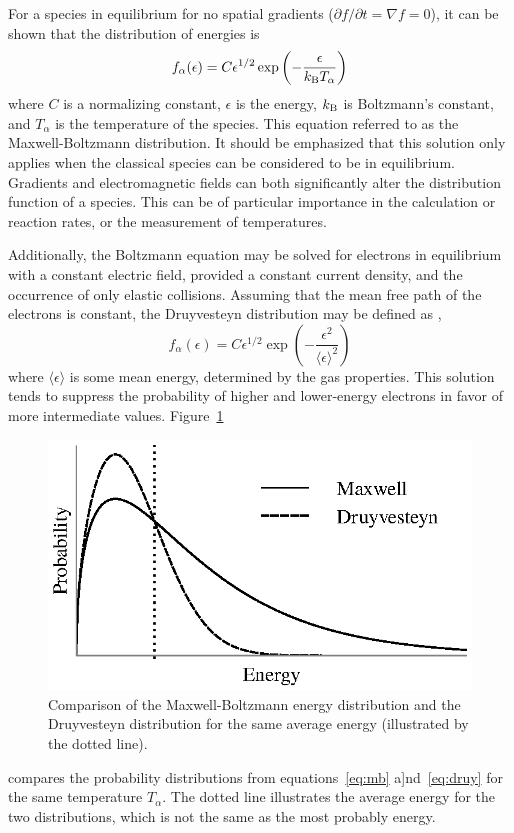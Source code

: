 For a species in equilibrium for no spatial gradients ($\partial f/\partial t =
\nabla f = 0$), it can be shown \cite{Druyvesteyn1940} that the distribution of
energies is
\begin{equation}\label{eq:mb}
  f_\alpha(\epsilon) = C \epsilon^{1/2}
          \exp\left( -\frac{\epsilon}{k_\mathrm{B} T_\alpha}\right)
\end{equation}
where $C$ is a normalizing constant, $\epsilon$ is the energy, $k_\mathrm{B}$ is
Boltzmann's constant, and $T_\alpha$ is the temperature of the species. This
equation referred to as the Maxwell-Boltzmann distribution. It should be
emphasized that this solution only applies when the classical species can be
considered to be in equilibrium. Gradients and electromagnetic fields can both
significantly alter the distribution function of a species. This can be of
particular importance in the calculation or reaction rates, or the measurement
of temperatures.

Additionally, the Boltzmann equation may be solved for electrons in equilibrium
with a constant electric field, provided a constant current density, and the
occurrence of only elastic collisions. Assuming that the mean free path of the
electrons is constant, the Druyvesteyn distribution may be defined as
\cite{Druyvesteyn1940},
\begin{equation}
  f_\alpha(\epsilon) = C \epsilon^{1/2}
           \exp\left(-\frac{\epsilon^2}{\langle \epsilon \rangle^2} \right)
  \label{eq:druy}
\end{equation}
where $\langle\epsilon\rangle$ is some mean energy, determined by the gas
properties. This solution tends to suppress the probability of higher and
lower-energy electrons in favor of more intermediate values.
Figure~\ref{fig:simpledists}
\begin{figure}
  \centering
  \includegraphics{./chapters/theory/figures/simpledists.eps}
  \caption{Comparison of the Maxwell-Boltzmann energy distribution and the
    Druyvesteyn distribution for the same average energy (illustrated by the
  dotted line).}
  \label{fig:simpledists}
\end{figure}
compares the probability distributions from equations~\ref{eq:mb}
a]nd~\ref{eq:druy} for the same temperature $T_\alpha$. The dotted line
illustrates the average energy for the two distributions, which is not the same
as the most probably energy.

